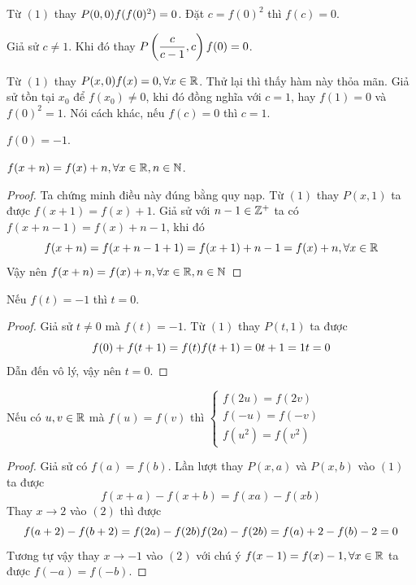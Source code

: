 \documentclass[11pt]{scrartcl}
\begin{document}
\begin{itemize}[label=, leftmargin=0em, itemsep=0.5em]
\begin{sol}
        Từ $(1)$ thay $P(0,0) \ra f(f(0)^2) = 0$. Đặt $c = f(0)^2$ thì $f(c) = 0$. 
    
        Giả sử $c \neq 1$. Khi đó thay $P\left(\frac{c}{c - 1},c\right) \ra f(0) = 0$.
    
        Từ $(1)$ thay $P(x,0) \ra f(x) = 0, \xr$. Thử lại thì thấy hàm này thỏa mãn. Giả sử tồn tại $x_0$ để $f(x_0) \neq 0$, khi đó đồng nghĩa với $c = 1$, hay $f(1) = 0$ và $f(0)^2 = 1$. Nói cách khác, nếu $f(c) = 0$ thì $c = 1$.
        
         $f(0) = - 1$. 
        
         $f(x + n) = f(x) + n, \forall x\in \mathbb{R}, n \in \mathbb{N}$. 
        
        \begin{proof} Ta chứng minh điều này đúng bằng quy nạp. 
          Từ $(1)$ thay $P(x,1)$ ta được $f(x + 1) = f(x) + 1$. Giả sử với $n - 1 \in \mathbb{Z^+}$ ta có $f(x + n - 1) = f(x) + n - 1$, khi đó 
          \[
          f(x + n) = f(x + n - 1 + 1) = f(x + 1) + n - 1 = f(x) + n ,\forall x\in \mathbb{R}
          \]
          Vậy nên $f(x + n) = f(x) + n, \forall x\in \mathbb{R}, n \in \mathbb{N}$
        \end{proof}
         Nếu $f(t) = - 1$ thì $t = 0$. 
        \begin{proof}
          Giả sử $t \neq 0$ mà $f(t) = -1$. Từ $(1)$ thay $P(t , 1)$ ta được
          \[
            f(0) + f(t + 1) = f(t)
            \lra f(t + 1) = 0
            \lra t + 1 = 1
            \lra t = 0
          \]
          Dẫn đến vô lý, vậy nên $t = 0$.
        \end{proof}
         Nếu có $u,v \in \mathbb{R}$ mà $f(u) = f(v)$ thì \(
          \left\{
          \begin{array}{l}
          f(2u) = f(2v) \\
          f(-u) = f(-v) \\
          f(u^2) = f(v^2)
          \end{array}
          \right.
          \)
          \begin{proof}
            Giả sử có $f(a) = f(b)$. Lần lượt thay $P(x,a)$ và $P(x,b)$ vào $(1)$ ta được 
            \[
              f(x + a) - f(x + b) = f(xa) - f(xb) \tag{2}
            \]
            Thay $x \to 2$ vào $(2)$ thì được
            \[
              f(a + 2) - f(b + 2)  = f(2a) - f(2b) \lra f(2a) - f(2b) = f(a) + 2 - f(b) - 2 = 0
            \]
            Tương tự vậy thay $x \to -1 $ vào $(2)$ với chú ý $f(x - 1) = f(x) - 1,\forall x\in \mathbb{R}$ ta được $f(-a) = f(-b)$.
    

\end{proof}
\end{sol}
\end{itemize}
\end{document}
